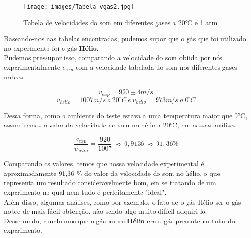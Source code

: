 \begin{figure}[H]
  \centering
  \texttt{[image: images/Tabela vgas2.jpg]}
  \caption{Tabela de velocidades do som em diferentes gases a 20°C e 1 atm}
\end{figure}

Baseando-nos nas tabelas encontradas, pudemos supor que o gás que foi utilizado no experimento foi o gás \textbf{Hélio}.\\

Pudemos pressupor isso, comparando a velocidade do som obtida por nós experimentalmente $v_{exp}$ com a velocidade tabelada do som nos diferentes gases nobres.

\[v_{exp} = 920 \pm 4 m/s\]
\[v_{helio} = 1007 m/s \  a \ 20^\circ C \  e  \  v_{helio} = 973 m/s\ a \ 0^\circ C\]

Dessa forma, como o ambiente do teste estava a uma temperatura maior que 0°C, assumiremos o valor da velocidade do som no hélio a 20°C, em nossas análises.

\[ \frac{v_{exp}}{v_{helio}}=\frac{920}{1007} \ \approx \ 0,9136 \ \approx \ 91,36\%  \]

Comparando os valores, temos que nossa velocidade experimental é aproximadamente 91,36 \% do valor da velocidade do som no hélio, o que representa um resultado consideravelmente bom, em se tratando de um experimento no qual nem tudo é perfeitamente "ideal".\\ 

Além disso, algumas análises, como por exemplo, o fato de o gás Hélio ser o gás nobre de mais fácil obtenção, não sendo algo muito difícil adquiri-lo. \\

Desse modo, concluímos que o gás nobre \textbf{Hélio} era o gás presente no tubo do experimento.  
